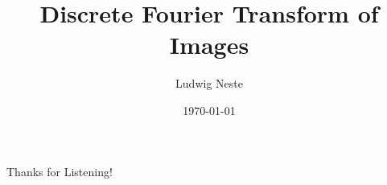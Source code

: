 \documentclass[aspectratio=169]{beamer}
\title{Discrete Fourier Transform of Images}
\date{\today}
\author{Ludwig Neste}
\institute{\colorbox{mDarkTeal}{\texttt{[image: su\_logo.pdf]}}}
\begin{document}
\begin{frame}
    \titlepage
\end{frame}





\begin{frame}{Thanks for Listening!}
    \printbibliography
\end{frame}
\end{document}
